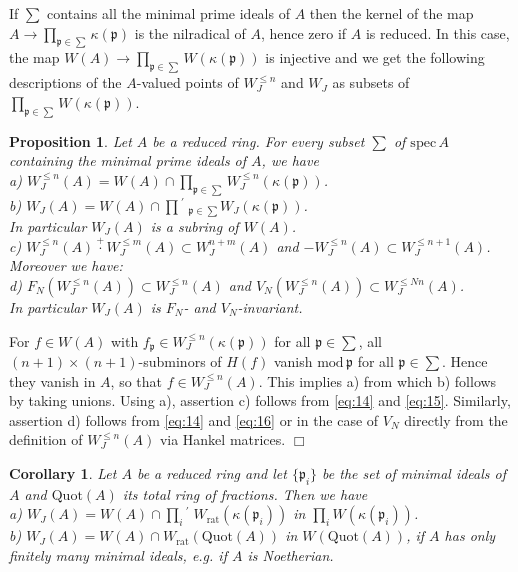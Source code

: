 \documentclass[12pt,leqno]{article}
\newcommand{\dis}{\displaystyle}
\renewcommand{\mod}{\mathrm{mod}\,}
\newcommand{\spec}{\mathrm{spec}\,}
\newcommand{\rat}{\mathrm{rat}}
\newcommand{\ep}{\mathfrak{p}}
\newcommand{\rdp}{\!^{\dis\prime}\;}
\newtheorem{prop}[theorem]{Proposition}
\newtheorem{cor}[theorem]{Corollary}
\newenvironment{proof}{\noindent {\bf Proof}}{\mbox{}\hspace*{\fill}$\Box$}
\newcommand{\Quot}{\mathrm{Quot}}
\begin{document}
If $\sum$ contains all the minimal prime ideals of $A$ then the kernel of the map $A \to \prod_{\ep \in \sum} \kappa (\ep)$ is the nilradical of $A$, hence zero if $A$ is reduced. In this case, the map $W (A) \to \prod_{\ep \in \sum} W (\kappa (\ep))$ is injective and we get the following descriptions of the $A$-valued points of $W^{\le n}_J$ and $W_J$ as subsets of $\prod_{\ep \in \sum} W (\kappa (\ep))$.

\begin{prop}
\label{t2.3}
Let $A$ be a reduced ring. For every subset $\sum$ of $\spec A$ containing the minimal prime ideals of $A$, we have\\
a) $W^{\le n}_J (A) = W (A)\cap \prod_{\ep \in \sum} W^{\le n}_J (\kappa (\ep))$.\\
b) $W_J (A) = W (A) \cap \prod\rdp\!\!\!_{\ep \in \sum} W_J (\kappa (\ep))$.\\
In particular $W_J (A)$ is a subring of $W (A)$.\\
c) $W^{\le n}_J (A) \overset{+}{\cdot} W^{\le m}_J (A) \subset W^{n+m}_J (A)$ and $-W^{\le n}_J (A) \subset W^{\le n+1}_J (A)$. \\
Moreover we have:\\
d) $F_N (W^{\le n}_J (A)) \subset W^{\le n}_J (A)$ and $V_N (W^{\le n}_J (A)) \subset W^{\le Nn}_J (A)$.\\
In particular $W_J (A)$ is $F_N$- and $V_N$-invariant.
\end{prop}

\begin{proof}
For $f \in W (A)$ with $f_{\ep} \in W^{\le n}_J (\kappa (\ep))$ for all $\ep \in \sum$, all $(n+ 1) \times (n+1)$-subminors of $H (f)$ vanish $\mod \ep$ for all $\ep \in \sum$. Hence they vanish in $A$, so that $f \in W^{\le n}_J (A)$. This implies a) from which b) follows by taking unions. Using a), assertion c) follows from \eqref{eq:14} and \eqref{eq:15}. Similarly, assertion d) follows from \eqref{eq:14} and \eqref{eq:16} or in the case of $V_N$ directly from the definition of $W^{\le n}_J (A)$ via Hankel matrices.
\end{proof}

\begin{cor}
\label{t2.4}
Let $A$ be a reduced ring and let $\{ \ep_i \}$ be the set of minimal ideals of $A$ and $\Quot (A)$ its total ring of fractions. Then we have\\
a) $W_J (A) = W (A) \cap \prod_i\rdp W_{\rat} (\kappa (\ep_i))$ in $\prod_i W (\kappa (\ep_i))$.\\
b) $W_J (A) = W (A) \cap W_{\rat} (\Quot (A))$ in $W (\Quot (A))$, if $A$ has only finitely many minimal ideals, e.g. if $A$ is Noetherian.
\end{cor}
\end{document}
